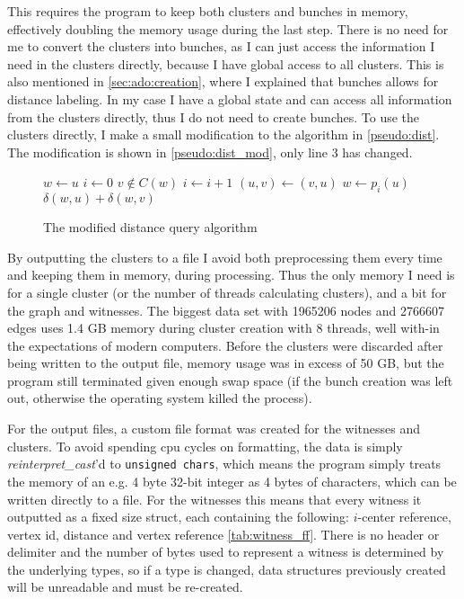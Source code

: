 This requires the program to keep both clusters and bunches in memory,
effectively doubling the memory usage during the last step. There is no
need for me to convert the clusters into bunches, as I can just access the
information I need in the clusters directly, because I have global access to
all clusters.
This is also mentioned in \autoref{sec:ado:creation}, where I explained that
bunches allows for distance labeling. In my case I have a global state and
can access all information from the clusters directly, thus I do not need
to create bunches. To use the clusters directly, I make a small modification
to the  algorithm in \autoref{pseudo:dist}. The modification is
shown in \autoref{pseudo:dist_mod}, only line 3 has changed.

\begin{figure}[htbp]
\begin{codebox}
    \li $w \gets u$
    \li $i \gets 0$ 
    \li \While $v \notin C(w)$
    \li     \Do
                $i \gets i+1$
    \li         $(u,v) \gets (v,u)$
    \li         $w \gets p_{i}(u)$
            \End
    \li \Return $\delta(w,u) + \delta(w,v)$
\end{codebox}
\caption{The modified distance query algorithm}
\label{pseudo:dist_mod}
\end{figure}

By outputting the clusters to a file I avoid both preprocessing them every
time and keeping them in memory, during processing. Thus the only memory I
need is for a single cluster (or the number of threads calculating clusters),
and a bit for the graph and witnesses. The biggest data set with 1965206
nodes and 2766607 edges uses 1.4 GB memory during cluster creation with
8 threads, well with-in the expectations of modern computers. Before the
clusters were discarded after being written to the output file, memory usage
was in excess of 50 GB, but the program still terminated given enough swap
space (if the bunch creation was left out, otherwise the operating system
killed the process).

For the output files, a custom file format was created for the witnesses and
clusters. To avoid spending cpu cycles on formatting, the data is simply
\emph{reinterpret\_cast}'d to \texttt{unsigned chars}, which means the program
simply treats the memory of an e.g. 4 byte 32-bit integer as 4 bytes of
characters, which can be written directly to a file. For the witnesses this
means that every witness it outputted as a fixed size struct, each containing
the following: $i$-center reference, vertex id, distance and vertex reference
\autoref{tab:witness_ff}. There is no header or delimiter and the number of
bytes used to represent a witness is determined by the underlying types, so if
a type is changed, data structures previously created will be unreadable and
must be re-created.

